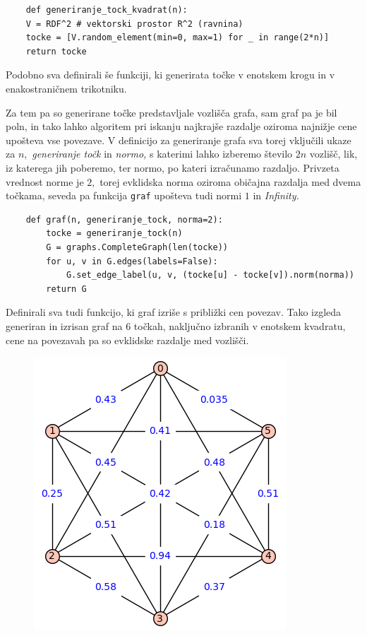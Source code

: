 \documentclass[a4paper, 11pt]{article}
\begin{document}
\small
\begin{verbatim}
    def generiranje_tock_kvadrat(n):
    V = RDF^2 # vektorski prostor R^2 (ravnina)
    tocke = [V.random_element(min=0, max=1) for _ in range(2*n)]
    return tocke 
\end{verbatim}
\normalsize

Podobno sva definirali še funkciji, ki generirata točke v enotskem krogu in v enakostraničnem trikotniku.

Za tem pa so generirane točke predstavljale vozlišča grafa, sam graf pa je bil poln,
in tako lahko algoritem pri iskanju najkrajše razdalje oziroma najnižje cene upošteva vse povezave.
V definicijo za generiranje grafa sva torej vključili ukaze za $n,$ \emph{generiranje točk} in \emph{normo,}
s katerimi lahko izberemo število $2n$ vozlišč, lik, iz katerega jih poberemo, ter normo, po kateri izračunamo razdaljo. 
Privzeta vrednost norme je $2,$ torej evklidska norma oziroma običajna razdalja med dvema točkama, seveda pa funkcija \texttt{graf} upošteva tudi normi $1$ in \emph{Infinity.}

\small
\begin{verbatim}
    def graf(n, generiranje_tock, norma=2):
        tocke = generiranje_tock(n)
        G = graphs.CompleteGraph(len(tocke))
        for u, v in G.edges(labels=False):
            G.set_edge_label(u, v, (tocke[u] - tocke[v]).norm(norma))
        return G
\end{verbatim}
\normalsize

Definirali sva tudi funkcijo, ki graf izriše s približki cen povezav.
Tako izgleda generiran in izrisan graf na $6$ točkah, naključno izbranih v enotskem kvadratu, cene na povezavah pa so evklidske razdalje med vozlišči.
\begin{figure}[h!]
    \includegraphics[scale=0.5]{graf1}
    \centering
\end{figure}
\end{document}
